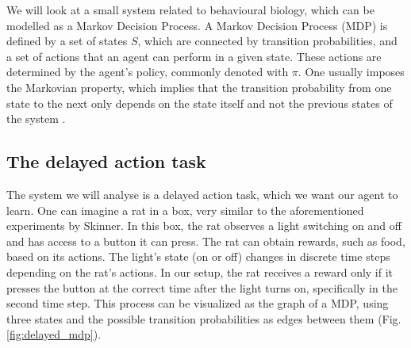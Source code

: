 \documentclass[12pt,a4paper]{article}
\begin{document}
We will look at a small system related to behavioural biology, which can be modelled as a Markov Decision Process.
A Markov Decision Process (MDP) \autocite{bellman1957MDP} is defined by a set of states $S$, which are connected by transition probabilities, and a set of actions that an agent can perform in a given state.
These actions are determined by the agent's policy, commonly denoted with $\pi$.
One usually imposes the Markovian property, which implies that the transition probability from one state to the next only depends on the state itself and not the previous states of the system \autocite{cover1999elements}.

\subsection{The delayed action task} \label{ssec:delayed_action_mdp}
The system we will analyse is a delayed action task, which we want our agent to learn.
One can imagine a rat in a box, very similar to the aforementioned experiments by Skinner.
In this box, the rat observes a light switching on and off and has access to a button it can press.
The rat can obtain rewards, such as food, based on its actions. The light's state (on or off) changes in discrete time steps depending on the rat's actions.
In our setup, the rat receives a reward only if it presses the button at the correct time after the light turns on, specifically in the second time step.
This process can be visualized as the graph of a MDP, using three states and the possible transition probabilities as edges between them (Fig. \ref{fig:delayed_mdp}).
\end{document}
